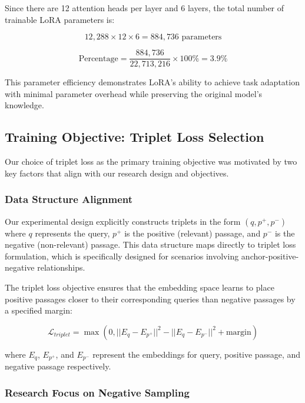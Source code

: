 Since there are 12 attention heads per layer and 6 layers, the total number of trainable LoRA parameters is:

\begin{equation}
12,288 \times 12 \times 6 = 884,736 \text{ parameters}
\end{equation}

\begin{equation}
\text{Percentage} = \frac{884,736}{22,713,216} \times 100\% = 3.9\%
\end{equation}

This parameter efficiency demonstrates LoRA's ability to achieve task adaptation with minimal parameter overhead while preserving the original model's knowledge.

\subsection{Training Objective: Triplet Loss Selection}

Our choice of triplet loss as the primary training objective was motivated by two key factors that align with our research design and objectives.

\subsubsection{Data Structure Alignment}

Our experimental design explicitly constructs triplets in the form $(q, p^+, p^-)$ where $q$ represents the query, $p^+$ is the positive (relevant) passage, and $p^-$ is the negative (non-relevant) passage. This data structure maps directly to triplet loss formulation, which is specifically designed for scenarios involving anchor-positive-negative relationships. 

The triplet loss objective ensures that the embedding space learns to place positive passages closer to their corresponding queries than negative passages by a specified margin:

\begin{equation}
\mathcal{L}_{triplet} = \max(0, ||E_q - E_{p^+}||^2 - ||E_q - E_{p^-}||^2 + \text{margin})
\end{equation}

where $E_q$, $E_{p^+}$, and $E_{p^-}$ represent the embeddings for query, positive passage, and negative passage respectively.

\subsubsection{Research Focus on Negative Sampling}

